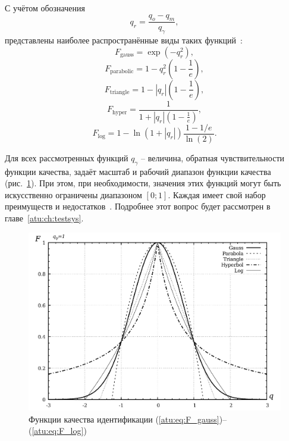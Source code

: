 С учётом обозначения
%
\[
  q_r = \frac{q_o - q_m}{q_\gamma},
\]
%
\noindent
представлены наиболее распространённые виды таких функций~\cite{atu_ISDMCI2016}:
%
\begin{equation}
  F_{\mathrm{gauss}} = \exp( - q_r^2 ),
\label{atu:eq:F_gauss}
\end{equation}
%
\begin{equation}
  F_{\mathrm{parabolic}} = 1 - q_r^2 \left( 1 - \frac{1}{e} \right),
\label{atu:eq:F_parabolic}
\end{equation}
%
\begin{equation}
  F_{\mathrm{triangle}} = 1 - |q_r| \left( 1 - \frac{1}{e} \right),
\label{atu:eq:F_triangle}
\end{equation}
%
\begin{equation}
  F_{\mathrm{hyper}} = \frac{1}{ 1 + |q_r| \left( 1 - \frac{1}{e} \right)},
\label{atu:eq:F_hyper}
\end{equation}
%
\begin{equation}
  F_{\mathrm{log}} = 1 - \ln \left( 1 + |q_r| \right) \frac{1-1/e}{\ln(2)}.
\label{atu:eq:F_log}
\end{equation}

Для всех рассмотренных функций $q_\gamma$ -- величина, обратная чувствительности
функции качества, задаёт масштаб и рабочий диапазон функции качества (рис.~\ref{atu:f:F_types}).
При этом, при необходимости, значения этих функций могут быть искусственно ограничены диапазоном $[0;1]$.
Каждая имеет свой набор преимуществ и недостатков~\cite{atu_ISDMCI2016}.
Подробнее этот вопрос будет рассмотрен в главе~\ref{atu:ch:testsys}.

\begin{figure}[htb!]
  \centerline{\includegraphics[width=45\TW]{p/F_types.png} }
  \caption{Функции качества идентификации (\ref{atu:eq:F_gauss})--(\ref{atu:eq:F_log})}
  \label{atu:f:F_types}
\end{figure}



